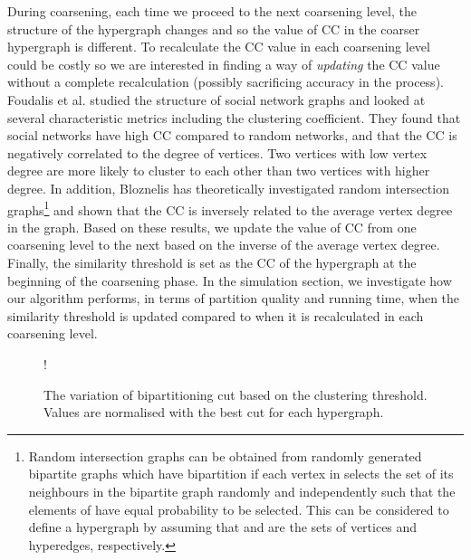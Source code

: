\documentclass[twocolumn]{svjour3}          \smartqed
\begin{document}
During coarsening, each time we proceed to the next coarsening level, the structure of the hypergraph changes and so the value of CC in the coarser hypergraph is different. To recalculate the CC value in  each coarsening level could be costly so we are interested in finding a way of \textit{updating} the CC value without a complete recalculation (possibly sacrificing accuracy in the process). Foudalis et al. \cite{foudalis2011social} studied the structure of social network graphs and looked at several characteristic metrics including the clustering coefficient. They found that social networks have high CC compared to random networks, and that the CC is negatively correlated to the degree of vertices. Two vertices with low vertex degree are more likely to cluster to each other than two vertices with higher degree. In addition, Bloznelis \cite{bloznelis2013} has theoretically investigated random intersection graphs\footnote{Random intersection graphs can be obtained from randomly generated bipartite graphs which have bipartition  if each vertex  in  selects the set  of its neighbours in the bipartite graph randomly and independently such that the elements of  have equal probability to be selected. This can be considered to define a hypergraph by assuming that  and  are the sets of vertices and hyperedges, respectively.} and shown that the CC is inversely related to the average vertex degree in the graph. Based on these results, we update the value of CC from one coarsening level to the next based on the inverse of the average vertex degree. Finally, the similarity threshold is set as the CC of the hypergraph at the beginning of the coarsening phase. In the simulation section, we investigate how our algorithm performs, in terms of partition quality and running time, when the similarity threshold is updated compared to when it is recalculated in each coarsening level.

\begin{figure}[t]
	\captionsetup{font=small,labelfont=bf}
	\centering
	\resizebox {0.45\textwidth} {!} {
	}
\caption{The variation of bipartitioning cut based on the clustering threshold. Values are normalised with the best cut for each hypergraph.}\label{fig:clus_thre_var}
\end{figure}
\end{document}
